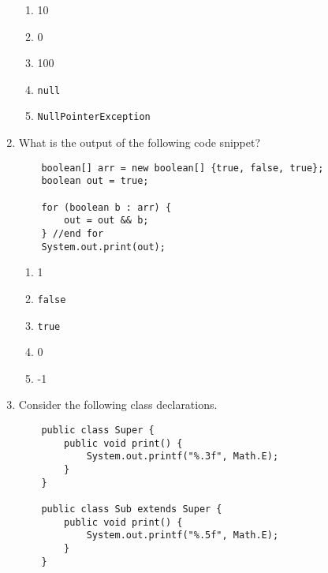 \documentclass[S17-Final.tex]{subfiles}
\begin{document}
\begin{enumerate}
\begin{enumerate}
\item  10
\item  0
\item  100
\item  \texttt{null}
\item  \texttt{NullPointerException} \ifdraft \Ans \fi 
\end{enumerate}

\item What is the output of the following code snippet?
\begin{lstlisting}
    boolean[] arr = new boolean[] {true, false, true};
    boolean out = true;
    
    for (boolean b : arr) {
        out = out && b;
    } //end for
    System.out.print(out);
\end{lstlisting}
	
\begin{enumerate}
\item  1
\item  \texttt{false} \ifdraft \Ans \fi 
\item  \texttt{true}
\item  0
\item  -1
\end{enumerate}

	
\clearpage
\item Consider the following class declarations.
\begin{lstlisting}
    public class Super {
        public void print() {
            System.out.printf("%.3f", Math.E);
        }
    }

    public class Sub extends Super {
        public void print() {
            System.out.printf("%.5f", Math.E);
        }
    }
    

\end{lstlisting}
\end{enumerate}
\end{document}
